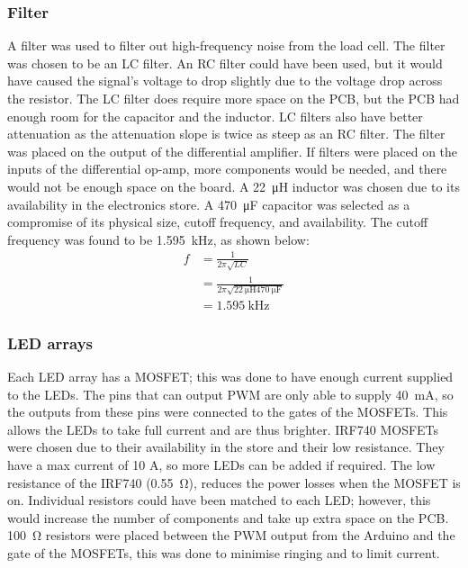 \documentclass[twoside]{article}
\newcommand\ddfrac[2]{\frac{\displaystyle #1}{\displaystyle #2}}
\newcommand{\amp}{\ampere}
\begin{document}
        \subsubsection{Filter}
        A filter was used to filter out high-frequency noise from the load cell. The filter was chosen to be an LC filter. An RC filter could have been used, but it would have caused the signal's voltage to drop slightly due to the voltage drop across the resistor. The LC filter does require more space on the PCB, but the PCB had enough room for the capacitor and the inductor. LC filters also have better attenuation as the attenuation slope is twice as steep as an RC filter. The filter was placed on the output of the differential amplifier. If filters were placed on the inputs of the differential op-amp, more components would be needed, and there would not be enough space on the board. A \SI{22}{\micro\henry} inductor was chosen due to its availability in the electronics store. A \SI{470}{\micro\farad} capacitor was selected as a compromise of its physical size, cutoff frequency, and availability. The cutoff frequency was found to be \SI{1.595}{\kilo\hertz}, as shown below:
        \begin{align}
            f &= \ddfrac{1}{2 \pi \sqrt{L C}} \label{eq:f1}\\
            &= \ddfrac{1}{2 \pi \sqrt{\SI{22}{\micro\henry} \SI{470}{\micro\farad}}} \label{eq:f2}\\
            &= \SI{1.595}{\kilo\hertz} \label{eq:f3}
        \end{align}

        \subsubsection{LED arrays}
        Each LED array has a MOSFET; this was done to have enough current supplied to the LEDs. The pins that can output PWM are only able to supply \SI{40}{\milli\amp}, so the outputs from these pins were connected to the gates of the MOSFETs. This allows the LEDs to take full current and are thus brighter. IRF740 MOSFETs were chosen due to their availability in the store and their low resistance. They have a max current of 10 A, so more LEDs can be added if required. The low resistance of the IRF740 (\SI{0.55}{\ohm}), reduces the power losses when the MOSFET is on. Individual resistors could have been matched to each LED; however, this would increase the number of components and take up extra space on the PCB. \SI{100}{\ohm} resistors were placed between the PWM output from the Arduino and the gate of the MOSFETs, this was done to minimise ringing and to limit current.
\end{document}
